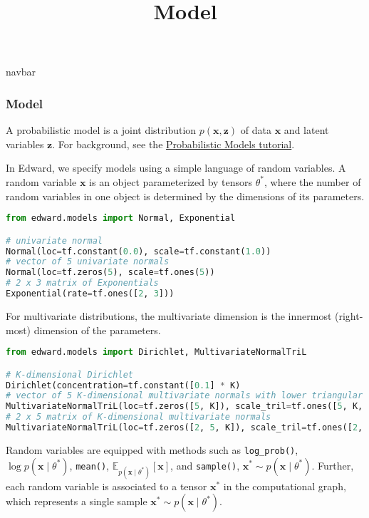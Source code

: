 \title{Model}

{{navbar}}

\subsubsection{Model}

A probabilistic model is a joint distribution $p(\mathbf{x},
\mathbf{z})$ of data $\mathbf{x}$ and latent variables $\mathbf{z}$.
For background, see the \href{/tutorials/model}{Probabilistic Models tutorial}.

In Edward, we specify models using a simple language of random variables.
A random variable $\mathbf{x}$ is an object parameterized by
tensors $\theta^*$, where
the number of random variables in one object is determined by
the dimensions of its parameters.

\begin{lstlisting}[language=Python]
from edward.models import Normal, Exponential

# univariate normal
Normal(loc=tf.constant(0.0), scale=tf.constant(1.0))
# vector of 5 univariate normals
Normal(loc=tf.zeros(5), scale=tf.ones(5))
# 2 x 3 matrix of Exponentials
Exponential(rate=tf.ones([2, 3]))
\end{lstlisting}

For multivariate distributions, the multivariate dimension is the
innermost (right-most) dimension of the parameters.

\begin{lstlisting}[language=Python]
from edward.models import Dirichlet, MultivariateNormalTriL

# K-dimensional Dirichlet
Dirichlet(concentration=tf.constant([0.1] * K)
# vector of 5 K-dimensional multivariate normals with lower triangular cov
MultivariateNormalTriL(loc=tf.zeros([5, K]), scale_tril=tf.ones([5, K, K]))
# 2 x 5 matrix of K-dimensional multivariate normals
MultivariateNormalTriL(loc=tf.zeros([2, 5, K]), scale_tril=tf.ones([2, 5, K, K]))
\end{lstlisting}

Random variables are equipped with methods such as
\texttt{log_prob()}, $\log p(\mathbf{x}\mid\theta^*)$,
\texttt{mean()}, $\mathbb{E}_{p(\mathbf{x}\mid\theta^*)}[\mathbf{x}]$,
and \texttt{sample()}, $\mathbf{x}^*\sim p(\mathbf{x}\mid\theta^*)$.
Further, each random variable is associated to a tensor $\mathbf{x}^*$ in the
computational graph, which represents a single sample $\mathbf{x}^*\sim
p(\mathbf{x}\mid\theta^*)$.

